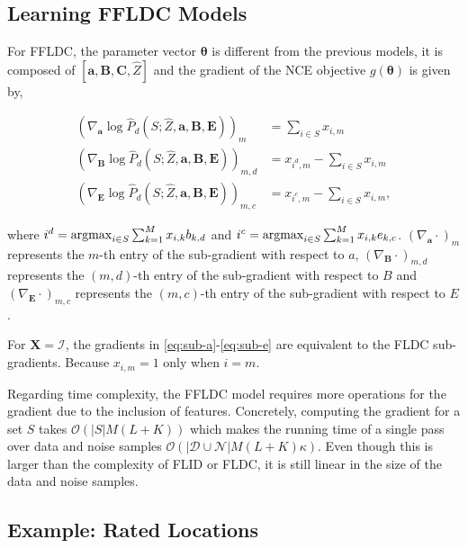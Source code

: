 \subsection{Learning FFLDC Models}

For FFLDC, the parameter vector $\boldsymbol{\theta}$ is different from the previous models, it is composed of $[\mathbf{a}, \mathbf{B}, \mathbf{C}, \hat{Z}]$ and the gradient of the NCE objective $g(\boldsymbol{\theta})$ is given by,

\begin{align}
  \left(\nabla_{\mathbf{a}}\log{\hat{P}_{d}(S; \hat{Z}, \mathbf{a}, \mathbf{B}, \mathbf{E})}\right)_{m} &= \sum_{i \in S} x_{i,m} \label{eq:sub-a}\\
  \left(\nabla_{\mathbf{B}}\log{\hat{P}_{d}(S; \hat{Z}, \mathbf{a}, \mathbf{B}, \mathbf{E})}\right)_{m,d} &= x_{i^{d},m} - \sum_{i \in S} x_{i,m} \label{eq:sub-b} \\
  \left(\nabla_{\mathbf{E}}\log{\hat{P}_{d}(S; \hat{Z}, \mathbf{a}, \mathbf{B}, \mathbf{E})}\right)_{m,c} &= x_{i^{c},m} - \sum_{i \in S} x_{i,m}, \label{eq:sub-e}
\end{align}

where $i^{d} = \operatorname*{argmax}_{i \in S}{\sum_{k=1}^{M}{x_{i,k}b_{k,d}}}$ and $i^{c} = \operatorname*{argmax}_{i \in S}{\sum_{k=1}^{M}x_{i,k}e_{k,c}}$. $\left(\nabla_{\mathbf{a}}\cdot \right)_{m}$ represents the $m$-th entry of the sub-gradient with respect to $a$, $\left(\nabla_{\mathbf{B}}\cdot\right)_{m,d}$ represents the $(m,d)$-th entry of the sub-gradient with respect to $B$ and $\left(\nabla_{\mathbf{E}}\cdot\right)_{m,c}$ represents the $(m,c)$-th entry of the sub-gradient with respect to $E$.

\begin{remark}
  For $\mathbf{X} = \mathcal{I}$, the gradients in \eqref{eq:sub-a}-\eqref{eq:sub-e} are equivalent to the FLDC sub-gradients. Because $x_{i,m} = 1$ only when $i = m$.
\end{remark}

Regarding time complexity, the FFLDC model requires more operations for the gradient due to the inclusion of features. Concretely, computing the gradient for a set $S$ takes $\mathcal{O}(|S|M(L+K))$ which makes the running time of a single pass over data and noise samples $\mathcal{O}(|\mathcal{D}\cup\mathcal{N}|M(L+K)\kappa)$. Even though this is larger than the complexity of FLID or FLDC, it is still linear in the size of the data and noise samples.

\subsection{Example: Rated Locations}
\label{sec:ffldc-toy}

